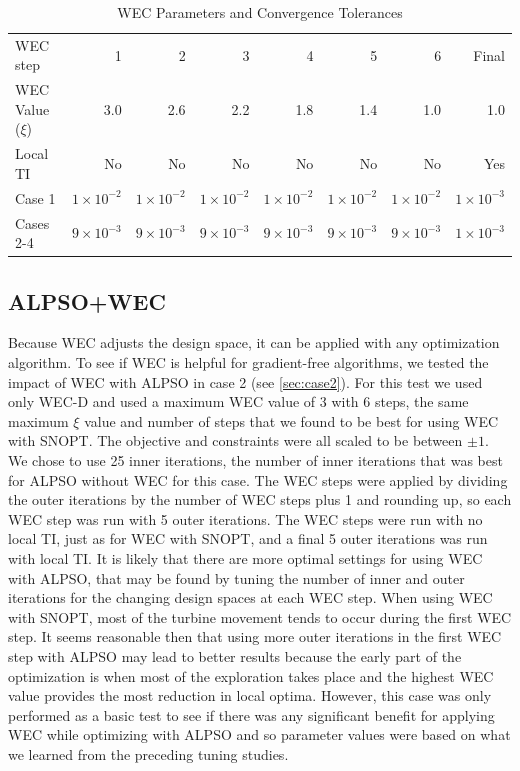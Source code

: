 \documentclass[journal abbreviation, manuscript]{copernicus}
\begin{document}
	\begin{table}[h!]
		\centering
		\caption{WEC Parameters and Convergence Tolerances}
		\label{tab:wectols}
		\begin{tabular}{lrrrrrrr}
			\toprule		
			WEC step & 1 & 2 & 3 & 4 & 5 & 6 & Final \\
			\cmidrule{2-8}
			WEC Value ($\xi$) & 3.0 & 2.6 & 2.2 & 1.8 & 1.4 & 1.0 & 1.0 \\
			Local TI & No & No & No & No & No & No & Yes \\
			Case 1 &	$1\times10^{-2}$ & $1\times10^{-2}$ & $1\times10^{-2}$ & $1\times10^{-2}$ & $1\times10^{-2}$ & $1\times10^{-2}$ & $1\times10^{-3}$ \\
			Cases 2-4 &	$9\times10^{-3}$ & $9\times10^{-3}$ & $9\times10^{-3}$ & $9\times10^{-3}$ & $9\times10^{-3}$ & $9\times10^{-3}$ & $1\times10^{-3}$ \\
			\bottomrule
		\end{tabular}
	\end{table}
	
	\subsection{ALPSO+WEC}
	Because WEC adjusts the design space, it can be applied with any optimization algorithm. To see if WEC is helpful for gradient-free algorithms, we tested the impact of WEC with ALPSO in case 2 (see \ref{sec:case2}). For this test we used only WEC-D and used a maximum WEC value of 3 with 6 steps, the same maximum $\xi$ value and number of steps that we found to be best for using WEC with SNOPT. The objective and constraints were all scaled to be between $\pm1$. We chose to use 25 inner iterations, the number of inner iterations that was best for ALPSO without WEC for this case. The WEC steps were applied by dividing the outer iterations by the number of WEC steps plus 1 and rounding up, so each WEC step was run with 5 outer iterations. The WEC steps were run with no local TI, just as for WEC with SNOPT, and a final 5 outer iterations was run with local TI. It is likely that there are more optimal settings for using WEC with ALPSO, that may be found by tuning the number of inner and outer iterations for the changing design spaces at each WEC step. When using WEC with SNOPT, most of the turbine movement tends to occur during the first WEC step. It seems reasonable then that using more outer iterations in the first WEC step with ALPSO may lead to better results because the early part of the optimization is when most of the exploration takes place and the highest WEC value provides the most reduction in local optima. However, this case was only performed as a basic test to see if there was any significant benefit for applying WEC while optimizing with ALPSO and so parameter values were based on what we learned from the preceding tuning studies.
	
\end{document}
